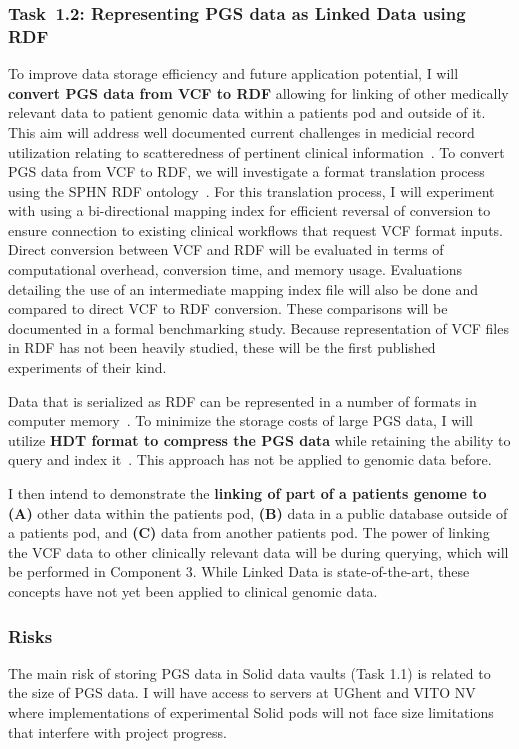 \documentclass[a4paper,11pt]{article}
\begin{document}
\begin{refsection}
\newcommand\WPab{Representing PGS data as Linked Data using RDF}
\subsubsection{Task~1.2: \WPab}

To improve data storage efficiency and future application potential, I will \textbf{convert PGS data from VCF to RDF} allowing for linking of other medically relevant data to patient genomic data within a patient\textquotesingle s pod and outside of it.
This aim will address well documented current challenges in medicial record utilization relating to scatteredness of pertinent clinical information~\cite{pastorino_benefits_2019}.
To convert PGS data from VCF to RDF, we will investigate a format translation process using the SPHN RDF ontology~\cite{van_der_horst_bridging_2023}. 
For this translation process, I will experiment with using a bi-directional mapping index for efficient reversal of conversion to ensure connection to existing clinical workflows that request VCF format inputs. 
Direct conversion between VCF and RDF will be evaluated in terms of computational overhead, conversion time, and memory usage.
Evaluations detailing the use of an intermediate mapping index file will also be done and compared to direct VCF to RDF conversion. 
These comparisons will be documented in a formal benchmarking study.
Because representation of VCF files in RDF has not been heavily studied, these will be the first published experiments of their kind.

Data that is serialized as RDF can be represented in a number of formats in computer memory~\cite{rdf_serializations}.
To minimize the storage costs of large PGS data, I will utilize \textbf{HDT format to compress the PGS data} while retaining the ability to query and index it~\cite{hdt}.
This approach has not be applied to genomic data before.

I then intend to demonstrate the \textbf{linking of part of a patient\textquotesingle s genome to}
\textbf{(A)} other data within the patient\textquotesingle s pod, 
\textbf{(B)} data in a public database outside of a patient\textquotesingle s pod, and
\textbf{(C)} data from another patient\textquotesingle s pod.
The power of linking the VCF data to other clinically relevant data will be during querying, which will be performed in Component 3.
While Linked Data is state-of-the-art, these concepts have not yet been applied to clinical genomic data.


\subsubsection{Risks}
The main risk of storing PGS data in Solid data vaults (Task 1.1) is related to the size of PGS data. 
I will have access to servers at UGhent and VITO NV where implementations of experimental Solid pods will not face size limitations that interfere with project progress.


\end{refsection}
\end{document}
